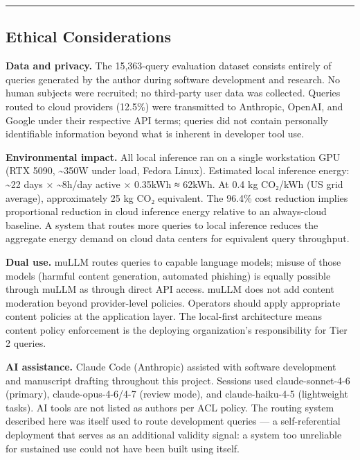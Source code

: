 \begin{center}\rule{0.5\linewidth}{0.5pt}\end{center}

\subsection{Ethical Considerations}\label{ethical-considerations}

\textbf{Data and privacy.} The 15,363-query evaluation dataset consists entirely of queries generated by the author during software development and research. No human subjects were recruited; no third-party user data was collected. Queries routed to cloud providers (12.5\%) were transmitted to Anthropic, OpenAI, and Google under their respective API terms; queries did not contain personally identifiable information beyond what is inherent in developer tool use.

\textbf{Environmental impact.} All local inference ran on a single workstation GPU (RTX 5090, \textasciitilde350W under load, Fedora Linux). Estimated local inference energy: \textasciitilde22 days × \textasciitilde8h/day active × 0.35kWh ≈ 62kWh. At 0.4 kg CO₂/kWh (US grid average), approximately 25 kg CO₂ equivalent. The 96.4\% cost reduction implies proportional reduction in cloud inference energy relative to an always-cloud baseline. A system that routes more queries to local inference reduces the aggregate energy demand on cloud data centers for equivalent query throughput.

\textbf{Dual use.} muLLM routes queries to capable language models; misuse of those models (harmful content generation, automated phishing) is equally possible through muLLM as through direct API access. muLLM does not add content moderation beyond provider-level policies. Operators should apply appropriate content policies at the application layer. The local-first architecture means content policy enforcement is the deploying organization's responsibility for Tier 2 queries.

\textbf{AI assistance.} Claude Code (Anthropic) assisted with software development and manuscript drafting throughout this project. Sessions used claude-sonnet-4-6 (primary), claude-opus-4-6/4-7 (review mode), and claude-haiku-4-5 (lightweight tasks). AI tools are not listed as authors per ACL policy. The routing system described here was itself used to route development queries --- a self-referential deployment that serves as an additional validity signal: a system too unreliable for sustained use could not have been built using itself.

